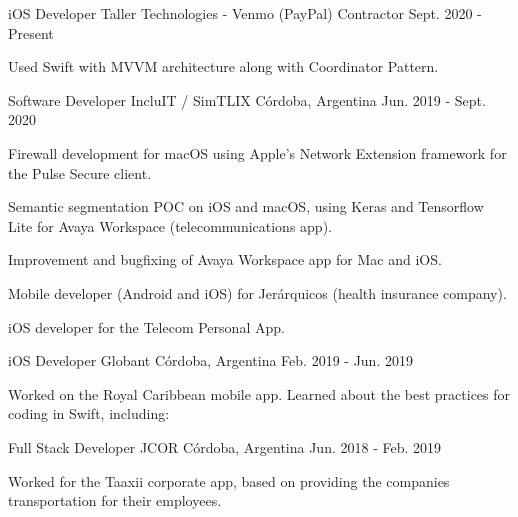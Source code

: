 \documentclass[10pt, a4paper]{resume}
\begin{document}
\begin{cventries}

  \cventry
    {iOS Developer}
    {Taller Technologies - Venmo (PayPal)}
    {Contractor}
    {Sept. 2020 - Present}
    {
      \begin{cvitems}
      \item {Used Swift with MVVM architecture along with Coordinator Pattern.}
      \end{cvitems}
    }


  \cventry
    {Software Developer}
    {IncluIT / SimTLIX}
    {Córdoba, Argentina}
    {Jun. 2019 - Sept. 2020}
    {
      \begin{cvitems}
      \item {Firewall development for macOS using Apple’s Network Extension framework for the Pulse Secure client.}
      \item {Semantic segmentation POC on iOS and macOS, using Keras and Tensorflow Lite for Avaya Workspace (telecommunications app).}
      \item {Improvement and bugfixing of Avaya Workspace app for Mac and iOS.}
      \item {Mobile developer (Android and iOS) for Jerárquicos (health insurance company).}
      \item {iOS developer for the Telecom Personal App.}
      \end{cvitems}
    }

  \cventry
    {iOS Developer}
    {Globant}
    {Córdoba, Argentina}
    {Feb. 2019 - Jun. 2019}
    {
      \begin{cvitems}
        \item {Worked on the Royal Caribbean mobile app. Learned about the best practices for coding in Swift, including: \newline
            }
      \end{cvitems}
    }

  \cventry
    {Full Stack Developer}
    {JCOR}
    {Córdoba, Argentina}
    {Jun. 2018 - Feb. 2019}
    {
      \begin{cvitems}
        \item {Worked for the Taaxii corporate app, based on providing the companies transportation for their employees.  \newline
        }
      \end{cvitems}
    }


\end{cventries}
\end{document}
